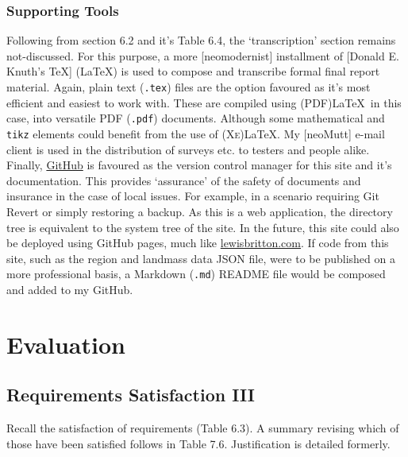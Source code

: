 \documentclass[11pt, english]{article}
\begin{document}
		\subsubsection{Supporting Tools}

	Following from section 6.2 and it's Table 6.4, the `transcription' section remains not-discussed. For this purpose, a more [neomodernist] installment of [Donald E. Knuth's {\TeX}] ({\LaTeX}) is used to compose and transcribe formal final report material. Again, plain text (\texttt{.tex}) files are the option favoured as it's most efficient and easiest to work with. These are compiled using (PDF){\LaTeX}\ in this case, into versatile PDF (\texttt{.pdf}) documents. Although some mathematical and \texttt{tikz} elements could benefit from the use of (\textsc{Xe}){\LaTeX}. My [neoMutt] e-mail client is used in the distribution of surveys etc. to testers and people alike.\\

	Finally, \href{https://github.com/FedeRog1977}{GitHub} is favoured as the version control manager for this site and it's documentation. This provides `assurance' of the safety of documents and insurance in the case of local issues. For example, in a scenario requiring Git Revert or simply restoring a backup. As this is a web application, the directory tree is equivalent to the system tree of the site. In the future, this site could also be deployed using GitHub pages, much like \href{http://lewisbritton.com/}{lewisbritton.com}. If code from this site, such as the region and landmass data JSON file, were to be published on a more professional basis, a Markdown (\texttt{.md}) README file would be composed and added to my GitHub.

\newpage

\section{Evaluation}\label{ch7}

	\subsection{Requirements Satisfaction III}

	Recall the satisfaction of requirements (Table 6.3). A summary revising which of those have been satisfied follows in Table 7.6. Justification is detailed formerly.
\end{document}
